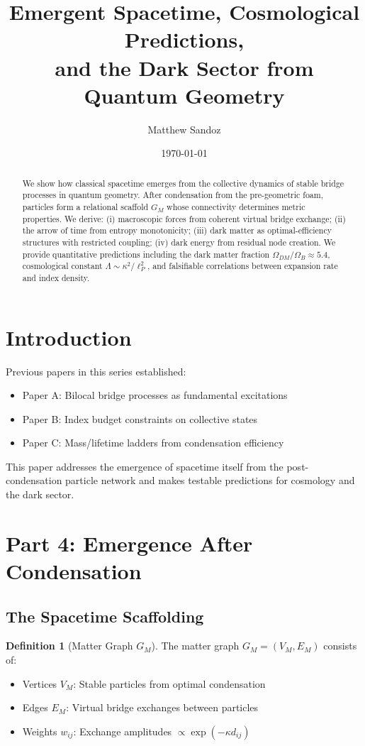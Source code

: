 \documentclass[11pt]{article}
\title{Emergent Spacetime, Cosmological Predictions, \\ and the Dark Sector from Quantum Geometry}
\author{Matthew Sandoz}
\date{\today}
\theoremstyle{plain}
\theoremstyle{definition}
\newtheorem{definition}[theorem]{Definition}
\begin{document}
\maketitle

\begin{abstract}
  We show how classical spacetime emerges from the collective dynamics of stable bridge processes in quantum geometry. After condensation from the pre-geometric foam, particles form a relational scaffold $G_M$ whose connectivity determines metric properties. We derive: (i) macroscopic forces from coherent virtual bridge exchange; (ii) the arrow of time from entropy monotonicity; (iii) dark matter as optimal-efficiency structures with restricted coupling; (iv) dark energy from residual node creation. We provide quantitative predictions including the dark matter fraction $\Omega_{DM}/\Omega_B \approx 5.4$, cosmological constant $\Lambda \sim \kappa^2/\ell_P^2$, and falsifiable correlations between expansion rate and index density.
\end{abstract}

\section{Introduction}
\label{sec:intro}

Previous papers in this series established:
\begin{itemize}
  \item Paper A: Bilocal bridge processes as fundamental excitations
  \item Paper B: Index budget constraints on collective states
  \item Paper C: Mass/lifetime ladders from condensation efficiency
\end{itemize}

This paper addresses the emergence of spacetime itself from the post-condensation particle network and makes testable predictions for cosmology and the dark sector.

\section{Part 4: Emergence After Condensation}
\label{sec:emergence}

\subsection{The Spacetime Scaffolding}

\begin{definition}[Matter Graph $G_M$]
  The matter graph $G_M = (V_M, E_M)$ consists of:
  \begin{itemize}
    \item Vertices $V_M$: Stable particles from optimal condensation
    \item Edges $E_M$: Virtual bridge exchanges between particles
    \item Weights $w_{ij}$: Exchange amplitudes $\propto \exp(-\kappa d_{ij})$
  \end{itemize}
\end{definition}
\end{document}
